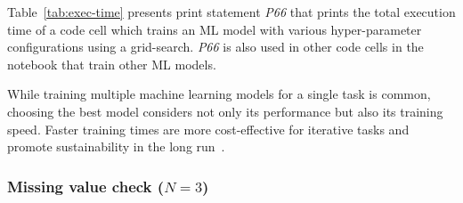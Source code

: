 Table~\ref{tab:exec-time} presents print statement \emph{P66} that prints the total execution time of a code cell which trains an ML model with various hyper-parameter configurations using a grid-search. \emph{P66} is also used in other code cells in the notebook that train other ML models.

While training multiple machine learning models for a single task is common, choosing the best model considers not only its performance but also its training speed. Faster training times are more cost-effective for iterative tasks and promote sustainability in the long run~\cite{shome2022data}.


\subsubsection{Missing value check ($N = 3$)}

